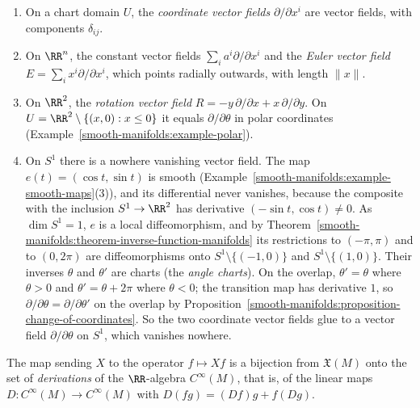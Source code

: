 \begin{example}\label{smooth-manifolds:example-vector-fields}
\begin{enumerate}
\item On a chart domain $U$, the \emph{coordinate vector fields} $\partial/\partial x^i$ are vector fields, with components $\delta_{ij}$.
\item On $\RR^n$, the constant vector fields $\sum_ia^i\partial/\partial x^i$ and the \emph{Euler vector field} $E = \sum_ix^i\partial/\partial x^i$, which points
radially outwards, with length $\|x\|$.
\item On $\RR^2$, the \emph{rotation vector field} $R = -y\,\partial/\partial x + x\,\partial/\partial y$. On $U = \RR^2 \setminus \{(x, 0) : x \leq 0\}$ it
equals $\partial/\partial\theta$ in polar coordinates (Example~\ref{smooth-manifolds:example-polar}).
\item On $S^1$ there is a nowhere vanishing vector field. The map $e(t) = (\cos t, \sin t)$ is smooth
(Example~\ref{smooth-manifolds:example-smooth-maps}(3)), and its differential never vanishes, because the composite with the inclusion $S^1 \to \RR^2$ has
derivative $(-\sin t, \cos t) \neq 0$. As $\dim S^1 = 1$, $e$ is a local diffeomorphism, and by
Theorem~\ref{smooth-manifolds:theorem-inverse-function-manifolds} its restrictions to $(-\pi, \pi)$ and to $(0, 2\pi)$ are diffeomorphisms onto
$S^1 \setminus \{(-1, 0)\}$ and $S^1 \setminus \{(1, 0)\}$. Their inverses $\theta$ and $\theta'$ are charts (the \emph{angle charts}). On the overlap,
$\theta' = \theta$ where $\theta > 0$ and $\theta' = \theta + 2\pi$ where $\theta < 0$; the transition map has derivative $1$, so
$\partial/\partial\theta = \partial/\partial\theta'$ on the overlap by Proposition~\ref{smooth-manifolds:proposition-change-of-coordinates}. So the two coordinate
vector fields glue to a vector field $\partial/\partial\theta$ on $S^1$, which vanishes nowhere.
\end{enumerate}
\end{example}

\begin{proposition}\label{smooth-manifolds:proposition-vector-fields-derivations}
The map sending $X$ to the operator $f \mapsto Xf$ is a bijection from $\mathfrak{X}(M)$ onto the set of \emph{derivations} of the $\RR$-algebra
$C^\infty(M)$, that is, of the linear maps $D \colon C^\infty(M) \to C^\infty(M)$ with $D(fg) = (Df)g + f(Dg)$.
\end{proposition}

